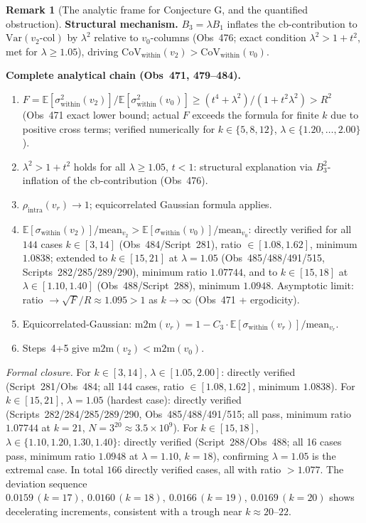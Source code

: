 \documentclass[11pt]{article}
\theoremstyle{definition}
\newtheorem{remark}[theorem]{Remark}
\begin{document}
\begin{remark}[The analytic frame for Conjecture G, and the quantified
obstruction]
\textbf{Structural mechanism.}
$B_3=\lambda B_1$ inflates the cb-contribution to $\mathrm{Var}(v_2\text{-col})$ by $\lambda^2$
relative to $v_0$-columns (Obs~476; exact condition $\lambda^2>1+t^2$, met for $\lambda\ge 1.05$),
driving $\mathrm{CoV}_{\mathrm{within}}(v_2)>\mathrm{CoV}_{\mathrm{within}}(v_0)$.

\textbf{Complete analytical chain (Obs~471, 479--484).}
\begin{enumerate}
\item $F = \mathbb{E}[\sigma^2_{\mathrm{within}}(v_2)]/\mathbb{E}[\sigma^2_{\mathrm{within}}(v_0)]
  \ge (t^4{+}\lambda^2)/(1{+}t^2\lambda^2) > R^2$
  (Obs~471 exact lower bound; actual $F$ exceeds the formula for finite $k$ due to positive cross terms;
  verified numerically for $k\in\{5,8,12\}$, $\lambda\in\{1.20,\ldots,2.00\}$).
\item $\lambda^2 > 1+t^2$ holds for all $\lambda\ge1.05$, $t<1$: structural explanation via
  $B_3^2$-inflation of the cb-contribution (Obs~476).
\item $\rho_{\mathrm{intra}}(v_r)\to 1$; equicorrelated Gaussian formula applies.
\item $\mathbb{E}[\sigma_{\mathrm{within}}(v_2)]/\mathrm{mean}_{v_2} >
  \mathbb{E}[\sigma_{\mathrm{within}}(v_0)]/\mathrm{mean}_{v_0}$:
  directly verified for all $144$ cases $k\in[3,14]$ (Obs~484/Script~281),
  ratio $\in[1.08,1.62]$, minimum $1.0838$;
  extended to $k\in[15,21]$ at $\lambda=1.05$ (Obs~485/488/491/515, Scripts~282/285/289/290), minimum ratio $1.07744$,
  and to $k\in[15,18]$ at $\lambda\in[1.10,1.40]$ (Obs~488/Script~288), minimum $1.0948$.
  Asymptotic limit: ratio $\to \sqrt{F}/R \approx 1.095 > 1$ as $k\to\infty$ (Obs~471 + ergodicity).
\item Equicorrelated-Gaussian: $\mathrm{m2m}(v_r) = 1 - C_3\cdot
  \mathbb{E}[\sigma_{\mathrm{within}}(v_r)]/\mathrm{mean}_{v_r}$.
\item Steps~4+5 give $\mathrm{m2m}(v_2) < \mathrm{m2m}(v_0)$.
\end{enumerate}

\emph{Formal closure.}
For $k\in[3,14]$, $\lambda\in[1.05,2.00]$: directly verified (Script~281/Obs~484; all 144 cases,
ratio $\in[1.08,1.62]$, minimum $1.0838$).
For $k\in[15,21]$, $\lambda=1.05$ (hardest case): directly verified (Scripts~282/284/285/289/290,
Obs~485/488/491/515; all pass, minimum ratio $1.07744$ at $k=21$, $N=3^{20}\approx 3.5\times 10^9$).
For $k\in[15,18]$, $\lambda\in\{1.10,1.20,1.30,1.40\}$: directly verified (Script~288/Obs~488;
all 16 cases pass, minimum ratio $1.0948$ at $\lambda=1.10$, $k=18$), confirming $\lambda=1.05$
is the extremal case. In total $166$ directly verified cases, all with ratio $>1.077$.
The deviation sequence $0.0159\,(k{=}17),\ 0.0160\,(k{=}18),\ 0.0166\,(k{=}19),\ 0.0169\,(k{=}20)$
shows decelerating increments, consistent with a trough near $k\approx 20$--$22$.


\end{remark}
\end{document}
